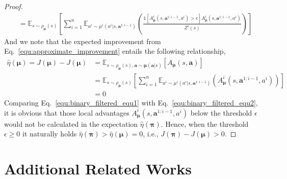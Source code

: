 \documentclass[11pt]{article}
\theoremstyle{plain}
\theoremstyle{remark}
\begin{document}
\begin{proof}
\begin{align}
    & = \mathbb{E}_{s\sim \rho_{\boldsymbol{\mu}}(s)} \left[ \sum_{i = 1}^{n} \mathbb{E}_{a^{i} \sim \mu^{i} (a^{i} | s, \boldsymbol{a}^{1:i - 1})} \left( \frac{\mathds{1}[A^{i}_{\boldsymbol{\mu}}(s, \boldsymbol{a}^{1:i-1}, a^i) > \epsilon] A_{\boldsymbol{\mu}}^{i} (s, \boldsymbol{a}^{1:i - 1}, a^i)}{Z^{i}(s)} \right) \right] \label{equ:binary_filtered_equ1}
\end{align}
And we note that the expected improvement from Eq.~\eqref{equ:approximate_improvement} entails the following relationship,
\begin{align}
    \hat{\eta}(\boldsymbol{\mu}) = J(\boldsymbol{\mu}) - J(\boldsymbol{\mu}) &= \mathbb{E}_{s\sim \rho_{\boldsymbol{\mu}}(s), \boldsymbol{a} \sim \boldsymbol{\mu}(\boldsymbol{a} | s)}\left[ A_{\boldsymbol{\mu}}(s, \boldsymbol{a}) \right] \nonumber\\
    & = \mathbb{E}_{s\sim \rho_{\boldsymbol{\mu}}(s)} \left[ \sum_{i = 1}^{n} \mathbb{E}_{a^{i} \sim \mu^{i} (a^{i} | s, \boldsymbol{a}^{1:i - 1})} \left( A_{\boldsymbol{\mu}}^{i} (s, \boldsymbol{a}^{1:i - 1}, a^i) \right) \right] \nonumber\\
    & = 0 \label{equ:binary_filtered_equ2}
\end{align}
Comparing Eq.~\eqref{equ:binary_filtered_equ1} with Eq.~\eqref{equ:binary_filtered_equ2}, it is obvious that those local advantages $A_{\boldsymbol{\mu}}^{i} (s, \boldsymbol{a}^{1:i - 1}, a^i)$ below the threshold $\epsilon$ would not be calculated in the expectation $\hat{\eta}(\boldsymbol{\pi})$. Hence, when the threshold $\epsilon \geq 0$ it naturally holds $\hat{\eta}(\boldsymbol{\pi}) > \hat{\eta}(\boldsymbol{\mu}) = 0$, i.e., $J(\boldsymbol{\pi}) - J(\boldsymbol{\mu}) > 0$.
\end{proof}

\section{Additional Related Works}\label{appendix:additional_related_work}
\end{document}
